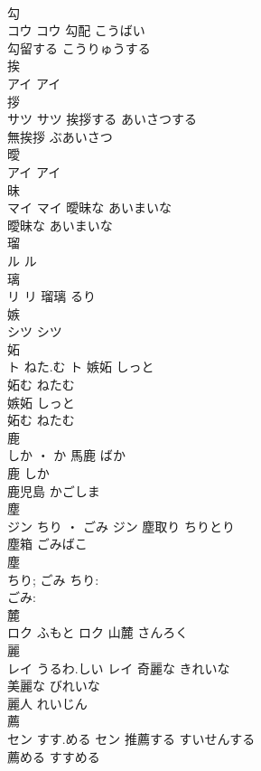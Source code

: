 \documentclass[8pt]{extreport}
\begin{document}
\begin{CJK}{UTF8}{min}
\\	勾	
\\	コウ		コウ	勾配	こうばい	
\\	勾留する	こうりゅうする	
\\	挨	
\\	アイ		アイ																																			
\\	拶	
\\	サツ		サツ	挨拶する	あいさつする	
\\	無挨拶	ぶあいさつ	
\\	曖	
\\	アイ		アイ																																			
\\	昧	
\\	マイ		マイ	曖昧な	あいまいな	
\\	曖昧な	あいまいな	
\\	瑠	
\\	ル		ル																																			
\\	璃	
\\	リ		リ													瑠璃	るり	
\\	嫉	
\\	シツ		シツ																																			
\\	妬	
\\	ト	ねた.む	ト	嫉妬	しっと	
\\	妬む	ねたむ	
\\	嫉妬	しっと	
\\	妬む	ねたむ	
\\	鹿	
\\	しか ・ か		馬鹿	ばか	
\\	鹿	しか	
\\	鹿児島	かごしま	
\\	塵	
\\	ジン	ちり ・ ごみ	ジン	塵取り	ちりとり	
\\	塵箱	ごみばこ	
\\	塵 
\\	ちり; ごみ	ちり: 
\\	ごみ: 
\\	麓	
\\	ロク	ふもと	ロク													山麓	さんろく	
\\	麗	
\\	レイ	うるわ.しい	レイ	奇麗な	きれいな	
\\	美麗な	びれいな	
\\	麗人	れいじん	
\\	薦	
\\	セン	すす.める	セン	推薦する	すいせんする	
\\	薦める	すすめる	

\end{CJK}
\end{document}
